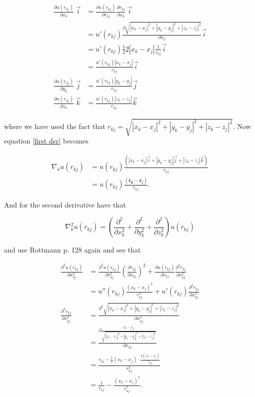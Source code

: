 \documentclass[a4paper,10pt,twoside]{report}
\begin{document}
\begin{align*}
\frac{\partial u(r_{kj})}{\partial x_k}\ \vec{i}  &= \frac{\partial u(r_{kj})}{\partial r_{kj}} \frac{\partial r_{kj}}{\partial x_k} \ \vec{i}\\
&= u'(r_{kj}) \frac{\partial \sqrt{|x_k - x_j|^2 + |y_k - y_j|^2 + |z_k - z_j|^2}}{\partial x_k} \vec{i}\\
&=u'(r_{kj}) \frac{1}{2} 2 |x_k - x_j|\frac{1}{r_{kj}} \vec{i}\\
&=\frac{u'(r_{kj})|x_k - x_j|}{r_{kj}} \vec{i}\\
\frac{\partial u(r_{kj})}{\partial y_k}\ \vec{j}  &= \frac{u'(r_{kj})|y_k - y_j|}{r_{kj}} \vec{j}\\
\frac{\partial u(r_{kj})}{\partial z_k}\ \vec{k}  &=\frac{u'(r_{kj})|z_k - z_j|}{r_{kj}} \vec{k}
\end{align*}

where we have used the fact that $r_{kj} = \sqrt{|x_k - x_j|^2 + |y_k - y_j|^2 + |z_k - z_j|^2}$. Now equation \eqref{first der} becomes

\begin{align*}
\nabla_k u(r_{kj}) &= u(r_{kj})\frac{(|x_k - x_j|\vec{i} + |y_k - y_j|\vec{j} + |z_k - z_j|\vec{k})}{r_{kj}}\\
&= u(r_{kj}) \frac{(\boldsymbol{r_k} - \boldsymbol{r_j})}{r_{kj}}.
\end{align*}

And for the second derivative have that

\begin{equation} \label{second der}
\nabla_k^2 u(r_{kj}) = \left(\frac{\partial^2}{\partial x_k^2} + \frac{\partial^2}{\partial y_k^2} + \frac{\partial^2}{\partial z_k^2}\right) u(r_{kj})
\end{equation}

and use Rottmann p. 128 again and see that

\begin{align*}
\frac{\partial^2 u(r_{kj})}{\partial x_{kj}^2} &= \frac{\partial^2 u(r_{kj})}{\partial r_{kj}^2} \left(\frac{\partial r_{kj}}{\partial x_{kj}}\right)^2 + \frac{\partial u(r_{kj})}{\partial r_{kj}} \frac{\partial^2 r_{kj}}{\partial x_{kj}^2}\\
& =u''(r_{kj}) \frac{(x_k - x_j)^2}{r_{kj}^2} + u'(r_{kj}) \frac{\partial^2 r_{kj}}{\partial x_{kj}^2}\\
\frac{\partial^2 r_{kj}}{\partial x_{kj}^2} &= \frac{\partial^2 \sqrt{|x_k - x_j|^2 + |y_k - y_j|^2 + |z_k - z_j|^2}}{\partial x_{kj}^2}\\
&= \frac{\partial \frac{x_k - x_j}{\sqrt{|x_k - x_j|^2 + |y_k - y_j|^2 + |z_k - z_j|^2}}}{\partial x_{kj}}\\
&= \frac{r_{kj} - \frac{1}{2} (x_k - x_j) \cdot \frac{2(x_k - x_j)}{r_{kj}}}{r_{kj}^2}\\
&= \frac{1}{r_{kj}} - \frac{(x_k - x_j)^2}{r_{kj}^3}.
\end{align*}
\end{document}
